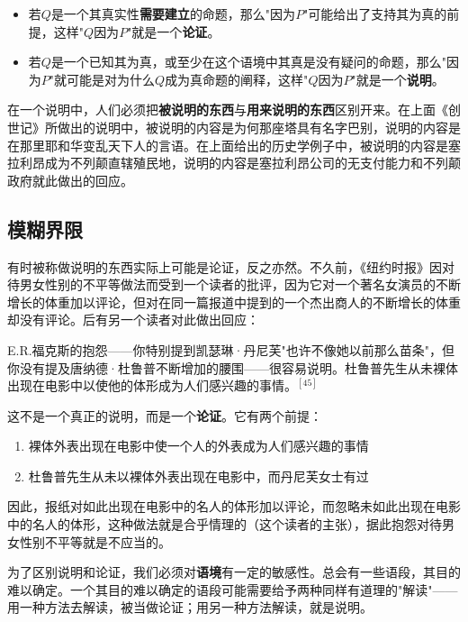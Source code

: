\begin{itemize}
  \item 若$Q$是一个其真实性\textbf{需要建立}的命题，那么"因为$P$"可能给出了支持其为真的前提，这样"$Q$因为$P$"就是一个\textbf{论证}。
  \item 若$Q$是一个已知其为真，或至少在这个语境中其真是没有疑问的命题，那么"因为$P$"就可能是对为什么$Q$成为真命题的阐释，这样"$Q$因为$P$"就是一个\textbf{说明}。
\end{itemize}

在一个说明中，人们必须把\textbf{被说明的东西}与\textbf{用来说明的东西}区别开来。在上面《创世记》所做出的说明中，被说明的内容是为何那座塔具有名字巴别，说明的内容是在那里耶和华变乱天下人的言语。在上面给出的历史学例子中，被说明的内容是塞拉利昂成为不列颠直辖殖民地，说明的内容是塞拉利昂公司的无支付能力和不列颠政府就此做出的回应。

\subsection{模糊界限}

有时被称做说明的东西实际上可能是论证，反之亦然。不久前，《纽约时报》因对待男女性别的不平等做法而受到一个读者的批评，因为它对一个著名女演员的不断增长的体重加以评论，但对在同一篇报道中提到的一个杰出商人的不断增长的体重却没有评论。后有另一个读者对此做出回应：

\begin{displayquote}
E.R.福克斯的抱怨——你特别提到凯瑟琳·丹尼芙"也许不像她以前那么苗条"，但你没有提及唐纳德·杜鲁普不断增加的腰围——很容易说明。杜鲁普先生从未裸体出现在电影中以使他的体形成为人们感兴趣的事情。$^{[45]}$
\end{displayquote}

这不是一个真正的说明，而是一个\textbf{论证}。它有两个前提：
\begin{enumerate}
  \item 裸体外表出现在电影中使一个人的外表成为人们感兴趣的事情
  \item 杜鲁普先生从未以裸体外表出现在电影中，而丹尼芙女士有过
\end{enumerate}

因此，报纸对如此出现在电影中的名人的体形加以评论，而忽略未如此出现在电影中的名人的体形，这种做法就是合乎情理的（这个读者的主张），据此抱怨对待男女性别不平等就是不应当的。

为了区别说明和论证，我们必须对\textbf{语境}有一定的敏感性。总会有一些语段，其目的难以确定。一个其目的难以确定的语段可能需要给予两种同样有道理的"解读"——用一种方法去解读，被当做论证；用另一种方法解读，就是说明。

\begin{center}
\end{center} 